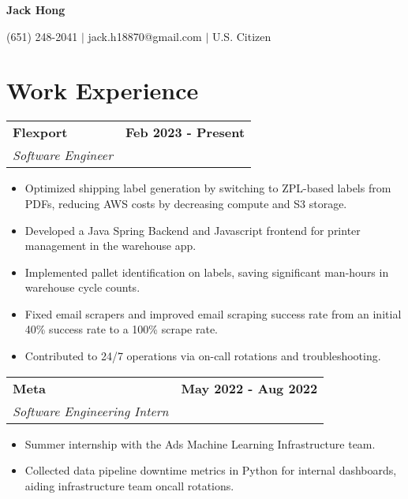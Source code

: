 \documentclass[11pt]{extreport}
\makeatletter
\newcommand{\resumeSubheading}[4]{
  \vspace{-1pt}
    \begin{tabular*}{1.0\textwidth}{l@{\extracolsep{\fill}}r}
      \textbf{#1} & \textbf{#2}  \vspace{1mm} \\
      {#3} & \textbf{#4} \\
    \end{tabular*}\vspace{-3pt}
}
\makeatother
\begin{document}
\vspace*{-40pt}
\begin{center}
	\textbf{{\LARGE Jack Hong}} \\
	      \vspace{2mm}

    (651) 248-2041 $|$ jack.h18870@gmail.com $|$ U.S. Citizen
\end{center}
\vspace{-4mm}

\section{Work Experience}
\resumeSubheading{Flexport}{Feb 2023 - Present}
    {\textit{Software Engineer}}{}
    \vspace{-3mm}
    \begin{itemize}
    \item[\textperiodcentered] Optimized shipping label generation by switching to ZPL-based labels from PDFs, reducing AWS costs by decreasing compute and S3 storage.
    \item[\textperiodcentered] Developed a Java Spring Backend and Javascript frontend for printer management in the warehouse app.
    \item[\textperiodcentered] Implemented pallet identification on labels, saving significant man-hours in warehouse cycle counts. 
        \item[\textperiodcentered] Fixed email scrapers and improved email scraping success rate from an initial 40\% success rate to a 100\% scrape rate.
    \item[\textperiodcentered] Contributed to 24/7 operations via on-call rotations and troubleshooting.

      \vspace{-1mm}
    \end{itemize}

\resumeSubheading{Meta}{May 2022 - Aug 2022}
    {\textit{Software Engineering Intern}}{}
    \vspace{-3mm}
    \begin{itemize}
    \item[\textperiodcentered] Summer internship with the Ads Machine Learning Infrastructure team.
    \vspace{-1mm}
     \item[\textperiodcentered] Collected data pipeline downtime metrics in Python for internal dashboards, aiding infrastructure team oncall rotations.
      \vspace{-1mm}
    \end{itemize}
    
\end{document}
